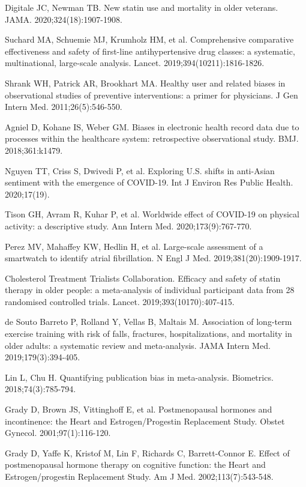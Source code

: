 \begin{references}
\item Digitale JC, Newman TB. New statin use and mortality in older veterans. JAMA. 2020;324(18):1907-1908.
\item Suchard MA, Schuemie MJ, Krumholz HM, et al. Comprehensive comparative effectiveness and safety of first-line antihypertensive drug classes: a systematic, multinational, large-scale analysis. Lancet. 2019;394(10211):1816-1826.
\item Shrank WH, Patrick AR, Brookhart MA. Healthy user and related biases in observational studies of preventive interventions: a primer for physicians. J Gen Intern Med. 2011;26(5):546-550.
\item Agniel D, Kohane IS, Weber GM. Biases in electronic health record data due to processes within the healthcare system: retrospective observational study. BMJ. 2018;361:k1479.
\item Nguyen TT, Criss S, Dwivedi P, et al. Exploring U.S. shifts in anti-Asian sentiment with the emergence of COVID-19. Int J Environ Res Public Health. 2020;17(19).
\item Tison GH, Avram R, Kuhar P, et al. Worldwide effect of COVID-19 on physical activity: a descriptive study. Ann Intern Med. 2020;173(9):767-770.
\item Perez MV, Mahaffey KW, Hedlin H, et al. Large-scale assessment of a smartwatch to identify atrial fibrillation. N Engl J Med. 2019;381(20):1909-1917.
\item Cholesterol Treatment Trialists Collaboration. Efficacy and safety of statin therapy in older people: a meta-analysis of individual participant data from 28 randomised controlled trials. Lancet. 2019;393(10170):407-415.
\item de Souto Barreto P, Rolland Y, Vellas B, Maltais M. Association of long-term exercise training with risk of falls, fractures, hospitalizations, and mortality in older adults: a systematic review and meta-analysis. JAMA Intern Med. 2019;179(3):394-405.
\item Lin L, Chu H. Quantifying publication bias in meta-analysis. Biometrics. 2018;74(3):785-794.
\item Grady D, Brown JS, Vittinghoff E, et al. Postmenopausal hormones and incontinence: the Heart and Estrogen/Progestin Replacement Study. Obstet Gynecol. 2001;97(1):116-120.
\item Grady D, Yaffe K, Kristof M, Lin F, Richards C, Barrett-Connor E. Effect of postmenopausal hormone therapy on cognitive function: the Heart and Estrogen/progestin Replacement Study. Am J Med. 2002;113(7):543-548.

\end{references}
